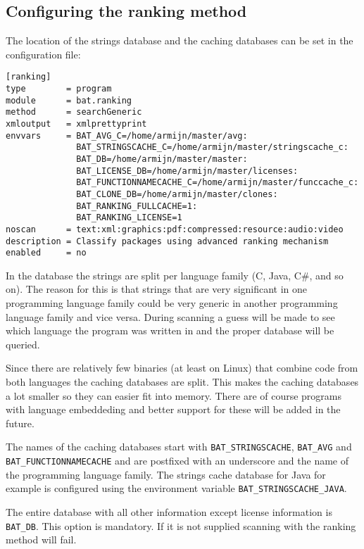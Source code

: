 \documentclass[10pt]{article}
\begin{document}
\subsection{Configuring the ranking method}

The location of the strings database and the caching databases can
be set in the configuration file:

\begin{verbatim}
[ranking]
type        = program
module      = bat.ranking
method      = searchGeneric
xmloutput   = xmlprettyprint
envvars     = BAT_AVG_C=/home/armijn/master/avg:
              BAT_STRINGSCACHE_C=/home/armijn/master/stringscache_c:
              BAT_DB=/home/armijn/master/master:
              BAT_LICENSE_DB=/home/armijn/master/licenses:
              BAT_FUNCTIONNAMECACHE_C=/home/armijn/master/funccache_c:
              BAT_CLONE_DB=/home/armijn/master/clones:
              BAT_RANKING_FULLCACHE=1:
              BAT_RANKING_LICENSE=1
noscan      = text:xml:graphics:pdf:compressed:resource:audio:video
description = Classify packages using advanced ranking mechanism
enabled     = no
\end{verbatim}

In the database the strings are split per language family (C, Java, C\#, and so
on). The reason for this is that strings that are very significant in one
programming language family could be very generic in another programming
language family and vice versa. During scanning a guess will be made to see
which language the program was written in and the proper database will be
queried.

Since there are relatively few binaries (at least on Linux) that combine
code from both languages the caching databases are split. This makes the
caching databases a lot smaller so they can easier fit into memory. There are
of course programs with language embeddeding and better support for these will
be added in the future.

The names of the caching databases start with
\texttt{BAT\_STRINGSCACHE}, \texttt{BAT\_AVG} and
\texttt{BAT\_FUNCTIONNAMECACHE} and are postfixed with an underscore and the
name of the programming language family.  The strings cache database for Java
for example is configured using the environment variable
\texttt{BAT\_STRINGSCACHE\_JAVA}.

The entire database with all other information except license information is
\texttt{BAT\_DB}. This option is mandatory. If it is not supplied scanning with
the ranking method will fail.
\end{document}
